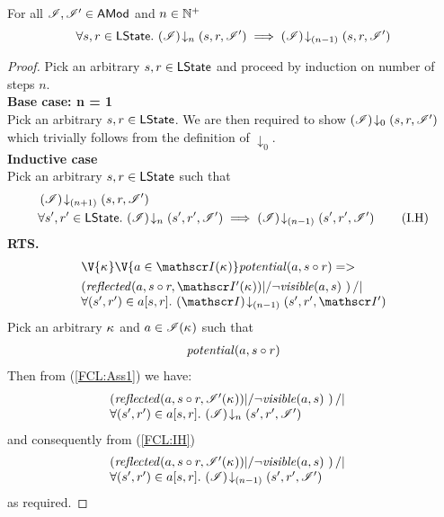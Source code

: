 \begin{lemma}[]\label{lem:future-closure}
For all $\mathscr{I}, \mathscr{I}' \in \textsf{AMod}$ and $n \in \mathbb{N}^{+}$
%
\[
	\forall s, r \in \textsf{LState}.\, \left(\mathscr{I}\right) \!\downarrow_{n} \left(s, r, \mathscr{I}'\right) \implies \left(\mathscr{I}\right) \!\downarrow_{(n-1)} \left(s, r, \mathscr{I}'\right)
\]
%
\begin{proof} Pick an arbitrary $s, r \in \textsf{LState}$ and proceed by induction on number of steps $n$.\\

\noindent\textbf{Base case: n = 1}\\
Pick an arbitrary $s, r \in \textsf{LState}$. We are then required to show $\left(\mathscr{I}\right) \!\downarrow_{0} \left(s, r, \mathscr{I}'\right)$ which trivially follows from the definition of $\downarrow_0$.\\

\noindent\textbf{Inductive case}\\
Pick an arbitrary $s, r \in \textsf{LState}$ such that
%
\begin{align}
	& \left(\mathscr{I}\right) \!\downarrow_{(n+1)} \left(s, r, \mathscr{I}'\right) \label{FCL:Ass1}\\
	& \forall s', r' \in \textsf{LState}.\, \left(\mathscr{I}\right) \!\downarrow_{n} \left(s', r', \mathscr{I}'\right) \implies \left(\mathscr{I}\right) \!\downarrow_{(n-1)} \left(s', r', \mathscr{I}'\right) \tag{I.H} \label{FCL:IH}
\end{align}
%
\textbf{RTS. }
%
\begin{align*} 
  &\V{\ca{}}\V{a\in \lmod(\ca{})}
  \m{potential}(a,s \composeL r) =>\null \nonumber \\
	& \begin{array}{@{} l @{}}
		\left(\m{reflected}(a, s \composeL r, \lmod'(\ca{})) |/ \neg\m{visible}(a, s) \ \right) /| \\
		\for{(s', r') \in a[s, r]} \extendsAMUpto{\lmod}{(n-1)}{s'}{r'}{\lmod'}
 	\end{array}
\end{align*}
%
Pick an arbitrary $\kappa_{}$ and $a \in \mathscr{I}(\kappa_{})$ such that 
\begin{align}
	\mathit{potential}(a, s \circ r) \label{FCL:Ass12}
\end{align}
Then from (\ref{FCL:Ass1}) we have: 
%
\begin{align*}
	& \begin{array}{@{} l @{}}
		\left(\m{reflected}(a,s \composeL r, \lmod'(\ca{})) |/ \neg\m{visible}(a, s) \ \right) /| \\
		\for{(s', r') \in a[s, r]} \extendsAMUpto{\lmod}{n}{s'}{r'}{\lmod'}
 	\end{array}
\end{align*}
%
and consequently from (\ref{FCL:IH})
%
\begin{align*}
  &\begin{array}{@{} l @{}}
		\left(\m{reflected}(a,s \composeL r, \lmod'(\ca{})) |/ \neg\m{visible}(a, s) \ \right) /| \\
		\for{(s', r') \in a[s, r]} \extendsAMUpto{\lmod}{(n-1)}{s'}{r'}{\lmod'}
 	\end{array}
\end{align*}
%
as required.

\end{proof}
\end{lemma}
%
%
